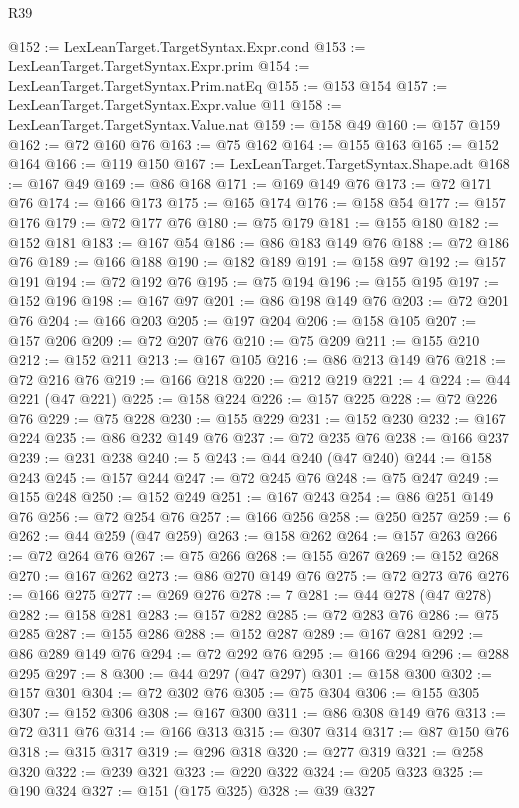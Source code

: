 \begin{lexlean}{R39}
\begin{coremodule}
@152 := LexLeanTarget.TargetSyntax.Expr.cond
@153 := LexLeanTarget.TargetSyntax.Expr.prim
@154 := LexLeanTarget.TargetSyntax.Prim.natEq
@155 := @153 @154
@157 := LexLeanTarget.TargetSyntax.Expr.value @11
@158 := LexLeanTarget.TargetSyntax.Value.nat
@159 := @158 @49
@160 := @157 @159
@162 := @72 @160 @76
@163 := @75 @162
@164 := @155 @163
@165 := @152 @164
@166 := @119 @150
@167 := LexLeanTarget.TargetSyntax.Shape.adt
@168 := @167 @49
@169 := @86 @168
@171 := @169 @149 @76
@173 := @72 @171 @76
@174 := @166 @173
@175 := @165 @174
@176 := @158 @54
@177 := @157 @176
@179 := @72 @177 @76
@180 := @75 @179
@181 := @155 @180
@182 := @152 @181
@183 := @167 @54
@186 := @86 @183 @149 @76
@188 := @72 @186 @76
@189 := @166 @188
@190 := @182 @189
@191 := @158 @97
@192 := @157 @191
@194 := @72 @192 @76
@195 := @75 @194
@196 := @155 @195
@197 := @152 @196
@198 := @167 @97
@201 := @86 @198 @149 @76
@203 := @72 @201 @76
@204 := @166 @203
@205 := @197 @204
@206 := @158 @105
@207 := @157 @206
@209 := @72 @207 @76
@210 := @75 @209
@211 := @155 @210
@212 := @152 @211
@213 := @167 @105
@216 := @86 @213 @149 @76
@218 := @72 @216 @76
@219 := @166 @218
@220 := @212 @219
@221 := 4
@224 := @44 @221 (@47 @221)
@225 := @158 @224
@226 := @157 @225
@228 := @72 @226 @76
@229 := @75 @228
@230 := @155 @229
@231 := @152 @230
@232 := @167 @224
@235 := @86 @232 @149 @76
@237 := @72 @235 @76
@238 := @166 @237
@239 := @231 @238
@240 := 5
@243 := @44 @240 (@47 @240)
@244 := @158 @243
@245 := @157 @244
@247 := @72 @245 @76
@248 := @75 @247
@249 := @155 @248
@250 := @152 @249
@251 := @167 @243
@254 := @86 @251 @149 @76
@256 := @72 @254 @76
@257 := @166 @256
@258 := @250 @257
@259 := 6
@262 := @44 @259 (@47 @259)
@263 := @158 @262
@264 := @157 @263
@266 := @72 @264 @76
@267 := @75 @266
@268 := @155 @267
@269 := @152 @268
@270 := @167 @262
@273 := @86 @270 @149 @76
@275 := @72 @273 @76
@276 := @166 @275
@277 := @269 @276
@278 := 7
@281 := @44 @278 (@47 @278)
@282 := @158 @281
@283 := @157 @282
@285 := @72 @283 @76
@286 := @75 @285
@287 := @155 @286
@288 := @152 @287
@289 := @167 @281
@292 := @86 @289 @149 @76
@294 := @72 @292 @76
@295 := @166 @294
@296 := @288 @295
@297 := 8
@300 := @44 @297 (@47 @297)
@301 := @158 @300
@302 := @157 @301
@304 := @72 @302 @76
@305 := @75 @304
@306 := @155 @305
@307 := @152 @306
@308 := @167 @300
@311 := @86 @308 @149 @76
@313 := @72 @311 @76
@314 := @166 @313
@315 := @307 @314
@317 := @87 @150 @76
@318 := @315 @317
@319 := @296 @318
@320 := @277 @319
@321 := @258 @320
@322 := @239 @321
@323 := @220 @322
@324 := @205 @323
@325 := @190 @324
@327 := @151 (@175 @325)
@328 := @39 @327

\end{coremodule}
\end{lexlean}
